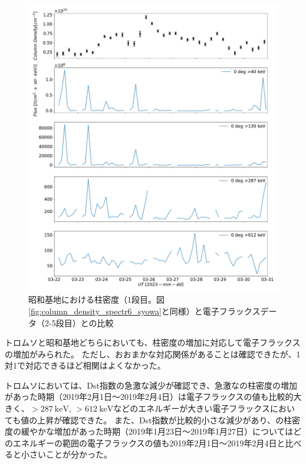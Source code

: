 \begin{figure}[htbp]
    \centering
    \includegraphics[width=\linewidth]{master_thesis_contents/master_thesis_fig/column_density_spectr6_poes0deg_syowa.pdf}
    \caption{昭和基地における柱密度（1段目。図\ref{fig:column_density_spectr6_syowa}と同様）と電子フラックスデータ（2-5段目）との比較}
    \label{fig:poes_mmcd_syowa}
\end{figure} \par

トロムソと昭和基地どちらにおいても、柱密度の増加に対応して電子フラックスの増加がみられた。
ただし、おおまかな対応関係があることは確認できたが、1対1で対応できるほど相関はよくなかった。\par

トロムソにおいては、Dst指数の急激な減少が確認でき、急激なの柱密度の増加があった時期（2019年2月1日〜2019年2月4日）は電子フラックスの値も比較的大きく、$>287\ \mathrm{keV}$, $>612\ \mathrm{keV}$などのエネルギーが大きい電子フラックスにおいても値の上昇が確認できた。
また、Dst指数が比較的小さな減少があり、の柱密度の緩やかな増加があった時期（2019年1月23日〜2019年1月27日）についてはどのエネルギーの範囲の電子フラックスの値も2019年2月1日〜2019年2月4日と比べると小さいことが分かった。\par

